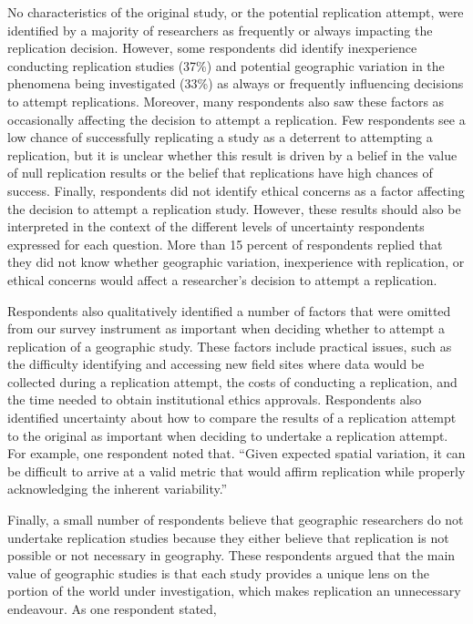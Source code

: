 \documentclass[]{interact}
\theoremstyle{plain}%
\theoremstyle{definition}
\theoremstyle{remark}
\begin{document}
No characteristics of the original study, or the potential replication attempt, were identified by a majority of researchers as frequently or always impacting the replication decision. 
However, some respondents did identify inexperience conducting replication studies (37\%) and potential geographic variation in the phenomena being investigated (33\%) as always or frequently influencing decisions to attempt replications. 
Moreover, many respondents also saw these factors as occasionally affecting the decision to attempt a replication.
Few respondents see a low chance of successfully replicating a study as a deterrent to attempting a replication, but it is unclear whether this result is driven by a belief in the value of null replication results or the belief that replications have high chances of success.
Finally, respondents did not identify ethical concerns as a factor affecting the decision to attempt a replication study. 
However, these results should also be interpreted in the context of the different levels of uncertainty respondents expressed for each question. 
More than 15 percent of respondents replied that they did not know whether geographic variation, inexperience with replication, or ethical concerns would affect a researcher's decision to attempt a replication. 

Respondents also qualitatively identified a number of factors that were omitted from our survey instrument as important when deciding whether to attempt a replication of a geographic study. 
These factors include practical issues, such as the difficulty identifying and accessing new field sites where data would be collected during a replication attempt, the costs of conducting a replication, and the time needed to obtain institutional ethics approvals.
Respondents also identified uncertainty about how to compare the results of a replication attempt to the original as important when deciding to undertake a replication attempt. 
For example, one respondent noted that. ``Given expected spatial variation, it can be difficult to arrive at a valid metric that would affirm replication while properly acknowledging the inherent variability.''

Finally, a small number of respondents believe that geographic researchers do not undertake replication studies because they either believe that replication is not possible or not necessary in geography. 
These respondents argued that the main value of geographic studies is that each study provides a unique lens on the portion of the world under investigation, which makes replication an unnecessary endeavour. 
As one respondent stated, 
\end{document}
